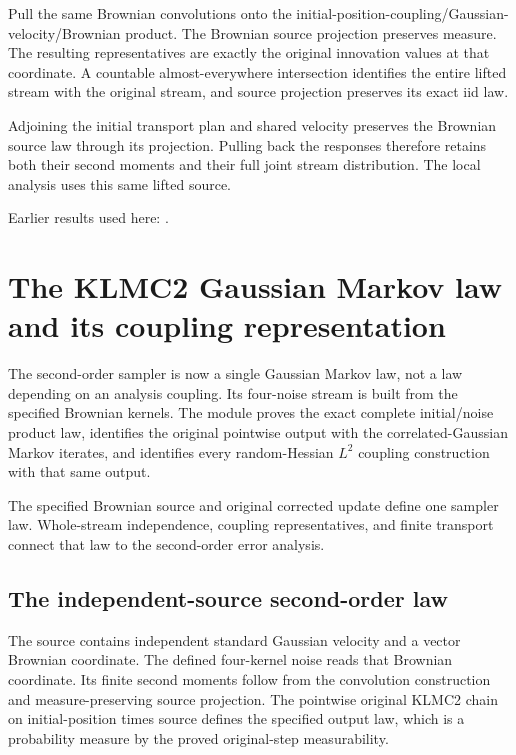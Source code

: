 \documentclass[11pt,a4paper]{report}
\begin{document}
Pull the same Brownian convolutions onto the initial-position-coupling/\allowbreak{}Gaussian-velocity/\allowbreak{}Brownian product. The Brownian source projection preserves measure. The resulting representatives are exactly the original innovation values at that coordinate. A countable almost-everywhere intersection identifies the entire lifted stream with the original stream, and source projection preserves its exact iid law.



Adjoining the initial transport plan and shared velocity preserves the Brownian source law through its projection. Pulling back the responses therefore retains both their second moments and their full joint stream distribution. The local analysis uses this same lifted source.



Earlier results used here: \cite[Section~3.8.17]{LangevinLean2026ULASC}.
\section{\texorpdfstring{The KLMC2 Gaussian Markov law and its coupling representation}{The KLMC2 Gaussian Markov law and its coupling representation}}
\label{proof-module-KineticLangevin-CanonicalKLMC2Law-lean}


The second-order sampler is now a single Gaussian Markov law, not a law depending on an analysis coupling. Its four-noise stream is built from the specified Brownian kernels. The module proves the exact complete initial/\allowbreak{}noise product law, identifies the original pointwise output with the correlated-Gaussian Markov iterates, and identifies every random-Hessian \(L^{2}\) coupling construction with that same output.



The specified Brownian source and original corrected update define one sampler law. Whole-stream independence, coupling representatives, and finite transport connect that law to the second-order error analysis.

\subsection{\texorpdfstring{The independent-source second-order law}{The independent-source second-order law}}
\label{report-step-KineticLangevin-CanonicalKLMC2Law-lean-1}


The source contains independent standard Gaussian velocity and a vector Brownian coordinate. The defined four-kernel noise reads that Brownian coordinate. Its finite second moments follow from the convolution construction and measure-preserving source projection. The pointwise original KLMC2 chain on initial-position times source defines the specified output law, which is a probability measure by the proved original-step measurability.
\end{document}
